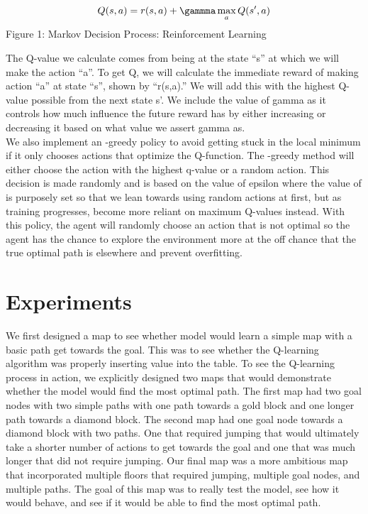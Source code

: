 \documentclass{article}
\begin{document}
\begin{center}
    \[Q(s,a) = r(s,a) + \gammma \max_{a} Q(s', a)\]
    \center Figure 1: Markov Decision Process: Reinforcement Learning
\end{center}

The Q-value we calculate comes from being at the state “s” at which we will make the action “a”. To get Q, we will calculate the immediate reward of making action “a” at state “s”, shown by “r(s,a).” We will add this with the highest Q-value possible from the next state s’. We include the value of gamma as it controls how much influence the future reward has by either increasing or decreasing it based on what value we assert gamma as. \\
We also implement an \textepsilon -greedy policy to avoid getting stuck in the local minimum if it only chooses actions that optimize the Q-function. The \textepsilon -greedy method will either choose the action with the highest q-value or a random action. This decision is made randomly and is based on the value of epsilon where the value of \textepsilon is purposely set so that we lean towards using random actions at first, but as training progresses, become more reliant on maximum Q-values instead. With this policy, the agent will randomly choose an action that is not optimal so the agent has the chance to explore the environment more at the off chance that the true optimal path is elsewhere and prevent overfitting. 

\section{Experiments}

We first designed a map to see whether model would learn a simple map with a basic path get towards the goal. This was to see whether the Q-learning algorithm was properly inserting value into the table. To see the Q-learning process in action, we explicitly designed two maps that would demonstrate whether the model would find the most optimal path. The first map had two goal nodes with two simple paths with one path towards a gold block and one longer path towards a diamond block. The second map had one goal node towards a diamond block with two paths. One that required jumping that would ultimately take a shorter number of actions to get towards the goal and one that was much longer that did not require jumping. Our final map was a more ambitious map that incorporated multiple floors that required jumping, multiple goal nodes, and multiple paths. The goal of this map was to really test the model, see how it would behave, and see if it would be able to find the most optimal path. 
\end{document}
